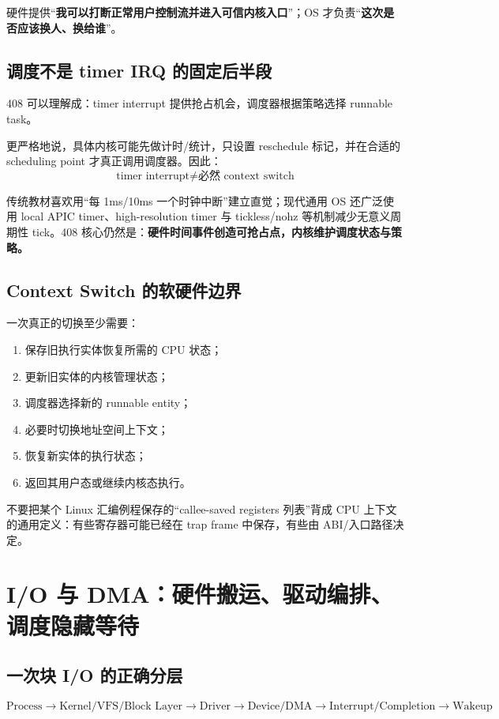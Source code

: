\documentclass[11pt,a4paper]{ctexart}
\newcommand{\kw}[1]{\textbf{#1}}
\begin{document}
硬件提供“\kw{我可以打断正常用户控制流并进入可信内核入口}”；OS 才负责“\kw{这次是否应该换人、换给谁}”。

\subsection{调度不是 timer IRQ 的固定后半段}
408 可以理解成：timer interrupt 提供抢占机会，调度器根据策略选择 runnable task。

更严格地说，具体内核可能先做计时/统计，只设置 reschedule 标记，并在合适的 scheduling point 才真正调用调度器。因此：
\[
\boxed{\text{timer interrupt} \neq \text{必然 context switch}}
\]

\begin{eng}
传统教材喜欢用“每 1ms/10ms 一个时钟中断”建立直觉；现代通用 OS 还广泛使用 local APIC timer、high-resolution timer 与 tickless/nohz 等机制减少无意义周期性 tick。408 核心仍然是：\kw{硬件时间事件创造可抢占点，内核维护调度状态与策略。}
\end{eng}

\subsection{Context Switch 的软硬件边界}
一次真正的切换至少需要：
\begin{enumerate}
  \item 保存旧执行实体恢复所需的 CPU 状态；
  \item 更新旧实体的内核管理状态；
  \item 调度器选择新的 runnable entity；
  \item 必要时切换地址空间上下文；
  \item 恢复新实体的执行状态；
  \item 返回其用户态或继续内核态执行。
\end{enumerate}

不要把某个 Linux 汇编例程保存的“callee-saved registers 列表”背成 CPU 上下文的通用定义：有些寄存器可能已经在 trap frame 中保存，有些由 ABI/入口路径决定。

\section{I/O 与 DMA：硬件搬运、驱动编排、调度隐藏等待}

\subsection{一次块 I/O 的正确分层}
\[
\boxed{
\text{Process}
\rightarrow
\text{Kernel/VFS/Block Layer}
\rightarrow
\text{Driver}
\rightarrow
\text{Device/DMA}
\rightarrow
\text{Interrupt/Completion}
\rightarrow
\text{Wakeup}
}
\]
\end{document}
